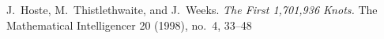 \begin{paper}








\begin{thebibliography}{}
J.~Hoste, M.~Thistlethwaite, and J.~Weeks.
\textit{The First 1,701,936 Knots.}
The Mathematical Intelligencer 20 (1998), no.~4, 33--48
\end{thebibliography}


\end{paper}

